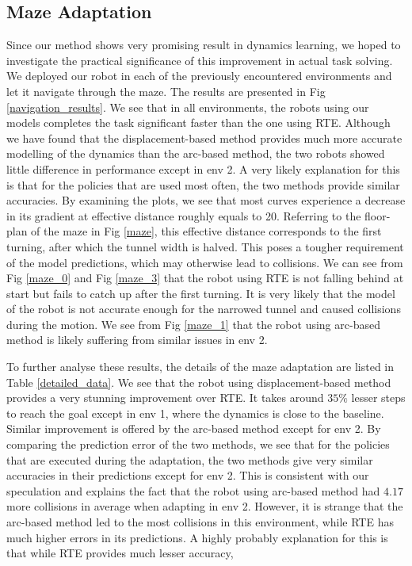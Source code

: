 \documentclass[journal]{IEEEtran}
\begin{document}
\subsection{Maze Adaptation}


Since our method shows very promising result in dynamics learning, we hoped to
investigate the practical significance of this improvement in actual task solving.
We deployed our robot in each of the previously encountered environments and let it navigate through the maze.
The results are presented in Fig \ref{navigation_results}. 
We see that in all environments, the robots using our models completes the task significant faster than the one using RTE.
Although we have found that the displacement-based method provides much more accurate modelling of the dynamics than the arc-based method, the two robots showed little difference in performance except in env 2.
A very likely explanation for this is that for the policies that are used most often, the two methods provide similar accuracies.
By examining the plots, we see that most curves experience a decrease in its gradient at effective distance roughly equals to 20.
Referring to the floor-plan of the maze in Fig \ref{maze}, this effective distance corresponds to the first turning, after which the tunnel width is halved.
This poses a tougher requirement of the model predictions, which may otherwise lead to collisions.
We can see from Fig \ref{maze_0} and Fig \ref{maze_3} that the robot using RTE 
is not falling behind at start but fails to catch up after the first turning.
It is very likely that the model of the robot is not accurate enough for the narrowed tunnel and caused collisions during the motion.
We see from Fig \ref{maze_1} that the robot using arc-based method is likely suffering from similar issues in env 2.


To further analyse these results, the details of the maze adaptation are listed in Table \ref{detailed_data}.
We see that the robot using displacement-based method provides a very stunning improvement over RTE.
It takes around $35\%$ lesser steps to reach the goal except in env 1, where the dynamics is close to the baseline.
Similar improvement is offered by the arc-based method except for env 2.
By comparing the prediction error of the two methods, we see that for the policies that are executed during the adaptation, the two methods give very similar accuracies in their predictions except for env 2.
This is consistent with our speculation and explains the fact that the robot using arc-based method had $4.17$ more collisions in average when adapting in env 2.
However, it is strange that the arc-based method led to the most collisions in this environment, while RTE has much higher errors in its predictions.
A highly probably explanation for this is that while RTE provides much lesser accuracy, 
\end{document}
